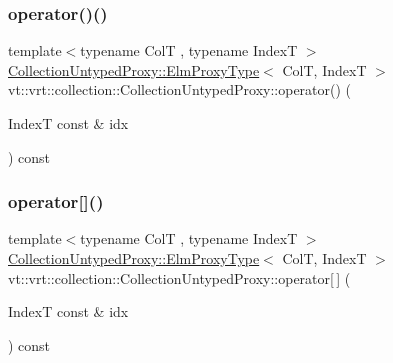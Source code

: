 \mbox{\label{structvt_1_1vrt_1_1collection_1_1_collection_untyped_proxy_a4db7a90e93f3e3a65544c6d947e0985d}} 
\subsubsection{\texorpdfstring{operator()()}{operator()()}}
{\footnotesize\ttfamily template$<$typename ColT , typename IndexT $>$ \\
\hyperlink{structvt_1_1vrt_1_1collection_1_1_collection_untyped_proxy_abf73984f3a31218515f9f4806f41cef5}{Collection\+Untyped\+Proxy\+::\+Elm\+Proxy\+Type}$<$ ColT, IndexT $>$ vt\+::vrt\+::collection\+::\+Collection\+Untyped\+Proxy\+::operator() (\begin{DoxyParamCaption}\item[{IndexT const \&}]{idx }\end{DoxyParamCaption}) const}

\mbox{\label{structvt_1_1vrt_1_1collection_1_1_collection_untyped_proxy_a04bd48b1cc06e903b520d91d09b01bb3}} 
\subsubsection{\texorpdfstring{operator[]()}{operator[]()}}
{\footnotesize\ttfamily template$<$typename ColT , typename IndexT $>$ \\
\hyperlink{structvt_1_1vrt_1_1collection_1_1_collection_untyped_proxy_abf73984f3a31218515f9f4806f41cef5}{Collection\+Untyped\+Proxy\+::\+Elm\+Proxy\+Type}$<$ ColT, IndexT $>$ vt\+::vrt\+::collection\+::\+Collection\+Untyped\+Proxy\+::operator\mbox{[}$\,$\mbox{]} (\begin{DoxyParamCaption}\item[{IndexT const \&}]{idx }\end{DoxyParamCaption}) const}



